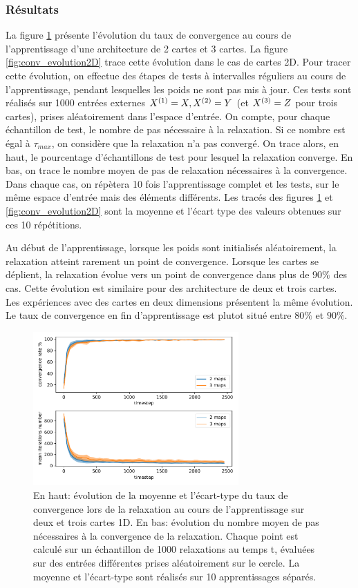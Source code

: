 \subsubsection{Résultats}
La figure \ref{fig:conv_evolution} présente l'évolution du taux de convergence au cours de l'apprentissage d'une architecture de 2 cartes et 3 cartes. La figure \ref{fig:conv_evolution2D} trace  cette évolution dans le cas de cartes 2D. Pour tracer cette évolution, on effectue des étapes de tests à intervalles réguliers au cours de l'apprentissage, pendant lesquelles les poids ne sont pas mis à jour. Ces tests sont réalisés sur 1000 entrées externes $X^{({1})} = X, X^{({2})}=Y$ (et $X^{({3})}=Z$ pour trois cartes), prises aléatoirement dans l'espace d'entrée. On compte, pour chaque échantillon de test, le nombre de pas nécessaire à la relaxation. Si ce nombre est égal à $\tau_{max}$, on considère que la relaxation n'a pas convergé. On trace alors, en haut, le pourcentage d'échantillons de test pour lesquel la relaxation converge. En bas, on trace le nombre moyen de pas de relaxation nécessaires à la convergence.
Dans chaque cas, on répètera 10 fois l'apprentissage complet et les tests, sur le même espace d'entrée mais des éléments différents. Les tracés des figures \ref{fig:conv_evolution} et \ref{fig:conv_evolution2D} sont la moyenne et l'écart type des valeurs obtenues sur ces 10 répétitions.

Au début de l'apprentissage, lorsque les poids sont initialisés aléatoirement, la relaxation atteint rarement un point de convergence. Lorsque les cartes se déplient, la relaxation évolue vers un point de convergence dans plus de $90 \%$ des cas. Cette évolution est similaire pour des architecture de deux et trois cartes. Les expériences avec des cartes en deux dimensions présentent la même évolution. Le taux de convergence en fin d'apprentissage est plutot situé entre $80 \%$ et $90 \%$.
 
\begin{figure}
\centering
\includegraphics[width=0.7\textwidth]{1D_conv_evolution_total.pdf}
\caption{En haut: évolution de la moyenne et l'écart-type du taux de convergence lors de la relaxation au cours de l'apprentissage sur deux et trois cartes 1D. En bas: évolution du nombre moyen de pas nécessaires à la convergence de la relaxation.
Chaque point est calculé sur un échantillon de 1000 relaxations au temps t, évaluées sur des entrées différentes prises aléatoirement sur le cercle. La moyenne et l'écart-type sont réalisés sur 10 apprentissages séparés.}
\label{fig:conv_evolution}
\end{figure}


